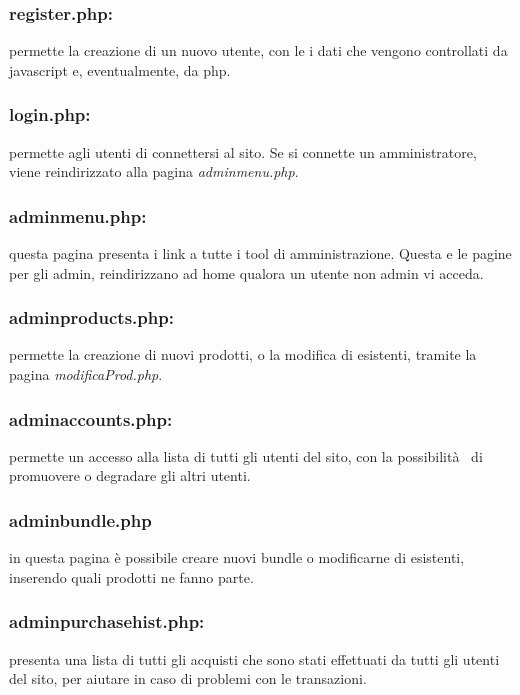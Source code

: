 \subsubsection{register.php:} \Spazio permette la creazione di un nuovo utente, con le i dati che vengono controllati da javascript e, eventualmente, da php.

\subsubsection{login.php:} \Spazio permette agli utenti di connettersi al sito. Se si connette un amministratore, viene reindirizzato alla pagina \textit{adminmenu.php}.

\subsubsection{adminmenu.php:} \Spazio questa pagina presenta i link a tutte i tool di amministrazione. Questa e le pagine per gli admin, reindirizzano ad home qualora un utente non admin vi acceda.

\subsubsection{adminproducts.php:} \Spazio permette la creazione di nuovi prodotti, o la modifica di esistenti, tramite la pagina \textit{modificaProd.php}.

\subsubsection{adminaccounts.php:} \Spazio permette un accesso alla lista di tutti gli utenti del sito, con la possibilità  di promuovere o degradare gli altri utenti.

\subsubsection{adminbundle.php}\Spazio in questa pagina è possibile creare nuovi bundle o modificarne di esistenti, inserendo quali prodotti ne fanno parte.

\subsubsection{adminpurchasehist.php:} \Spazio presenta una lista di tutti gli acquisti che sono stati effettuati da tutti gli utenti del sito, per aiutare in caso di problemi con le transazioni.

